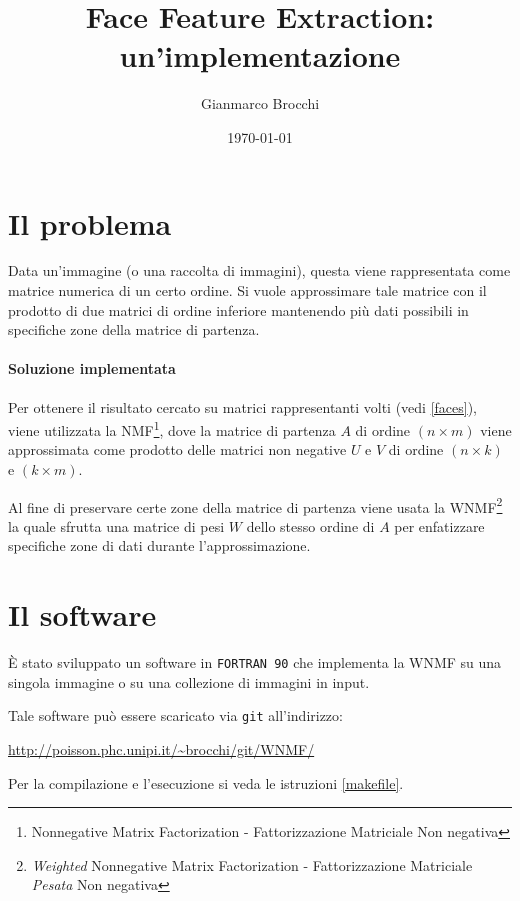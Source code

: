 \documentclass[a4paper]{article} %
\author{Gianmarco Brocchi}
\title{Face Feature Extraction: un'implementazione}
\date{\today}
\begin{document}
\maketitle

\section{Il problema}
Data un'immagine (o una raccolta di immagini), questa viene rappresentata come matrice numerica di un certo ordine. Si vuole approssimare tale matrice con il prodotto di due matrici di ordine inferiore mantenendo più dati possibili in specifiche zone della matrice di partenza.

\paragraph{Soluzione implementata}
Per ottenere il risultato cercato su matrici rappresentanti volti (vedi \ref{faces}), viene utilizzata la NMF\footnote{Nonnegative Matrix Factorization - Fattorizzazione Matriciale Non negativa}, dove la matrice di partenza $A$ di ordine $(n \times m)$ viene approssimata come prodotto delle matrici non negative $U$ e $V$ di ordine $(n \times k)$ e $(k \times m)$.

Al fine di preservare certe zone della matrice di partenza viene usata la WNMF\footnote{\emph{Weighted} Nonnegative Matrix Factorization - Fattorizzazione Matriciale \emph{Pesata} Non negativa} la quale sfrutta una matrice di pesi $W$ dello stesso ordine di $A$ per enfatizzare specifiche zone di dati durante l'approssimazione.

\section{Il software}
È stato sviluppato un software in \texttt{FORTRAN 90} che implementa la WNMF su una singola immagine o su una collezione di immagini in input.

Tale software può essere scaricato via \texttt{git} all'indirizzo:
\begin{center} \url{http://poisson.phc.unipi.it/~brocchi/git/WNMF/} \end{center}

Per la compilazione e l'esecuzione si veda le istruzioni \ref{makefile}.
\end{document}
